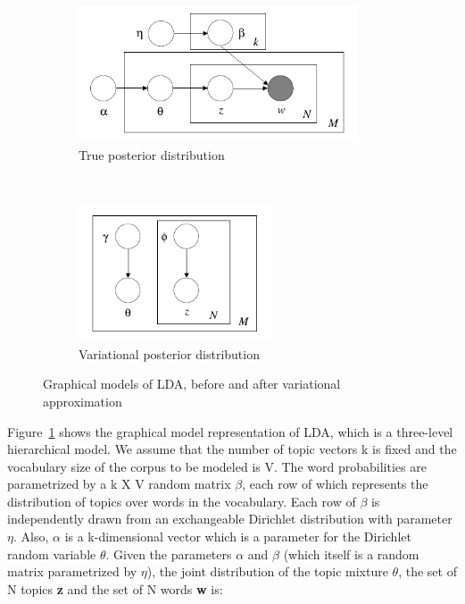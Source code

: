 \documentclass{article} %
\begin{document}
\begin{figure}[ht]
	\centering
	\begin{subfigure}[b]{0.45\textwidth}
	\includegraphics[width=\textwidth, height=4cm]{lda-model.png}
	\caption{True posterior distribution}
	\label{fig:lda-model}
	\end{subfigure}
	~
	\begin{subfigure}[b]{0.5\textwidth}
	\includegraphics[width=\textwidth, height=4cm]{lda-variational.png}
	\caption{Variational posterior distribution}
	\label{fig:lda-variational}
	\end{subfigure}
\caption{Graphical models of LDA, before and after variational approximation}
\label{fig:models}
\end{figure}


Figure~\ref{fig:lda-model} shows the graphical model representation of LDA, which is
a three-level hierarchical model. We
assume that the number of topic vectors k is fixed and the vocabulary size of
the corpus to be modeled is V. The word probabilities are parametrized
by a k X V random matrix $\beta$, each row of which represents the distribution 
of topics over words in the vocabulary. Each row of $\beta$ is independently 
drawn from an exchangeable Dirichlet distribution with parameter $\eta$.
Also, $\alpha$ is a k-dimensional vector 
which is a parameter for the Dirichlet random variable $\theta$. Given the
parameters $\alpha$ and $\beta$ (which itself is a random matrix parametrized
by $\eta$), the joint distribution of the topic mixture
$\theta$, the set of N topics {\bf z} and the set of N words {\bf w} is:
\end{document}

